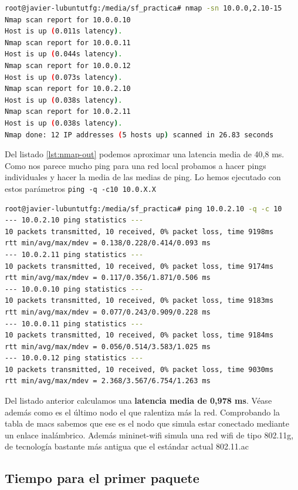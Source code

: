 \begin{lstlisting}[language=bash, label=lst:nmap-out, caption={Salida de nmap}]
root@javier-lubuntutfg:/media/sf_practica# nmap -sn 10.0.0,2.10-15
Nmap scan report for 10.0.0.10
Host is up (0.011s latency).
Nmap scan report for 10.0.0.11
Host is up (0.044s latency).
Nmap scan report for 10.0.0.12
Host is up (0.073s latency).
Nmap scan report for 10.0.2.10
Host is up (0.038s latency).
Nmap scan report for 10.0.2.11
Host is up (0.038s latency).
Nmap done: 12 IP addresses (5 hosts up) scanned in 26.83 seconds
\end{lstlisting}

Del listado \ref{lst:nmap-out} podemos aproximar una latencia media de 40,8 ms. Como nos parece mucho ping para una red local probamos a hacer pings individuales y hacer la media de las medias de ping. Lo hemos ejecutado con estos parámetros \lstinline{ping -q -c10 10.0.X.X}

\begin{lstlisting}[language=bash, label=lst:ping-out, caption={Salida de ping}]
root@javier-lubuntutfg:/media/sf_practica# ping 10.0.2.10 -q -c 10
--- 10.0.2.10 ping statistics ---
10 packets transmitted, 10 received, 0% packet loss, time 9198ms
rtt min/avg/max/mdev = 0.138/0.228/0.414/0.093 ms
--- 10.0.2.11 ping statistics ---
10 packets transmitted, 10 received, 0% packet loss, time 9174ms
rtt min/avg/max/mdev = 0.117/0.356/1.871/0.506 ms
--- 10.0.0.10 ping statistics ---
10 packets transmitted, 10 received, 0% packet loss, time 9183ms
rtt min/avg/max/mdev = 0.077/0.243/0.909/0.228 ms
--- 10.0.0.11 ping statistics ---
10 packets transmitted, 10 received, 0% packet loss, time 9184ms
rtt min/avg/max/mdev = 0.056/0.514/3.583/1.025 ms
--- 10.0.0.12 ping statistics ---
10 packets transmitted, 10 received, 0% packet loss, time 9030ms
rtt min/avg/max/mdev = 2.368/3.567/6.754/1.263 ms
\end{lstlisting}

Del listado anterior calculamos una \textbf{latencia media de 0,978 ms}. Véase además como es el último nodo el que ralentiza más la red. Comprobando la tabla de macs sabemos que ese es el nodo que simula estar conectado mediante un enlace inalámbrico. Además mininet-wifi simula una red wifi de tipo 802.11g, de tecnología bastante más antigua que el estándar actual 802.11.ac

\subsection{Tiempo para el primer paquete}

